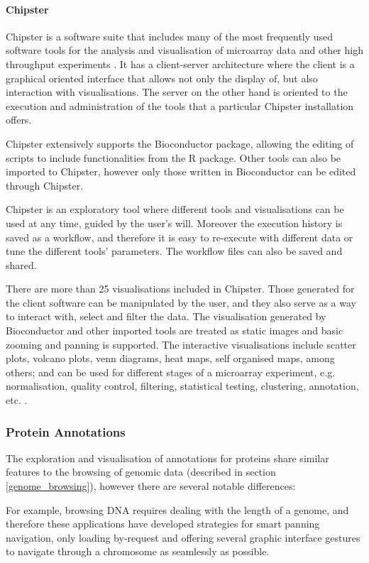 \paragraph{Chipster}
Chipster is a software suite that includes many of the most frequently used software tools for the analysis and visualisation of microarray data and other high throughput experiments \cite{KAL2011}. It has a client-server architecture where the client is a graphical oriented interface that allows not only the display of, but also interaction with visualisations. The server on the other hand is oriented to the execution and administration of the tools that a particular Chipster installation offers.

Chipster extensively supports the Bioconductor package, allowing the editing of scripts to include functionalities from the R package. Other tools can also be imported to Chipster, however only those written in Bioconductor can be edited through Chipster.

Chipster is an exploratory tool where different tools and visualisations can be used at any time, guided by the user's will. Moreover the execution history is saved as a workflow, and therefore it is easy to re-execute with different data or tune the different tools' parameters. The workflow files can also be saved and shared.

There are more than 25 visualisations included in Chipster. Those generated for the client software can be manipulated by the user, and they also serve as a way to interact with, select and filter the data. The visualisation generated by Bioconductor and other imported tools are treated as static images and basic zooming and panning is supported. The interactive visualisations include scatter plots, volcano plots, venn diagrams, heat maps, self organised maps, among others; and can be used for different stages of a microarray experiment, e.g. normalisation, quality control, filtering, statistical testing, clustering, annotation, etc. \cite{KAL2011}. 


\subsubsection{Protein Annotations} 

The exploration and visualisation of annotations for proteins share similar features to the browsing of genomic data (described in section \ref{genome_browsing}), however there are several notable differences:

For example, browsing DNA requires dealing with the length of a genome, and therefore these applications have developed strategies for smart panning navigation, only loading by-request and offering several graphic interface gestures to navigate through a chromosome as seamlessly as possible. 


